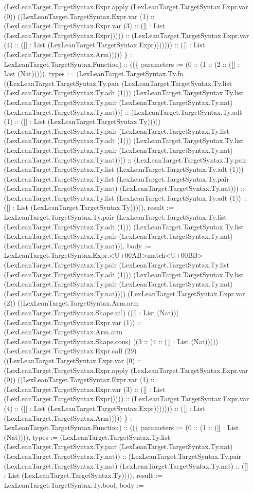 \documentclass[11pt]{article}
\begin{document}
(LexLeanTarget.TargetSyntax.Expr.apply (LexLeanTarget.TargetSyntax.Expr.var (0)) ((LexLeanTarget.TargetSyntax.Expr.var (1) :: (LexLeanTarget.TargetSyntax.Expr.var (3) :: ([] : List (LexLeanTarget.TargetSyntax.Expr))))) :: (LexLeanTarget.TargetSyntax.Expr.var (4) :: ([] : List (LexLeanTarget.TargetSyntax.Expr))))))) :: ([] : List (LexLeanTarget.TargetSyntax.Arm))))) \} : LexLeanTarget.TargetSyntax.Function) :: ((\{ parameters := (0 :: (1 :: (2 :: ([] : List (Nat))))), types := (LexLeanTarget.TargetSyntax.Ty.fn ((LexLeanTarget.TargetSyntax.Ty.pair (LexLeanTarget.TargetSyntax.Ty.list (LexLeanTarget.TargetSyntax.Ty.adt (1))) (LexLeanTarget.TargetSyntax.Ty.list (LexLeanTarget.TargetSyntax.Ty.pair (LexLeanTarget.TargetSyntax.Ty.nat) (LexLeanTarget.TargetSyntax.Ty.nat))) :: (LexLeanTarget.TargetSyntax.Ty.adt (1) :: ([] : List (LexLeanTarget.TargetSyntax.Ty))))) (LexLeanTarget.TargetSyntax.Ty.pair (LexLeanTarget.TargetSyntax.Ty.list (LexLeanTarget.TargetSyntax.Ty.adt (1))) (LexLeanTarget.TargetSyntax.Ty.list (LexLeanTarget.TargetSyntax.Ty.pair (LexLeanTarget.TargetSyntax.Ty.nat) (LexLeanTarget.TargetSyntax.Ty.nat)))) :: (LexLeanTarget.TargetSyntax.Ty.pair (LexLeanTarget.TargetSyntax.Ty.list (LexLeanTarget.TargetSyntax.Ty.adt (1))) (LexLeanTarget.TargetSyntax.Ty.list (LexLeanTarget.TargetSyntax.Ty.pair (LexLeanTarget.TargetSyntax.Ty.nat) (LexLeanTarget.TargetSyntax.Ty.nat))) :: (LexLeanTarget.TargetSyntax.Ty.list (LexLeanTarget.TargetSyntax.Ty.adt (1)) :: ([] : List (LexLeanTarget.TargetSyntax.Ty))))), result := LexLeanTarget.TargetSyntax.Ty.pair (LexLeanTarget.TargetSyntax.Ty.list (LexLeanTarget.TargetSyntax.Ty.adt (1))) (LexLeanTarget.TargetSyntax.Ty.list (LexLeanTarget.TargetSyntax.Ty.pair (LexLeanTarget.TargetSyntax.Ty.nat) (LexLeanTarget.TargetSyntax.Ty.nat))), body := LexLeanTarget.TargetSyntax.Expr.<U+00AB>match<U+00BB> (LexLeanTarget.TargetSyntax.Ty.pair (LexLeanTarget.TargetSyntax.Ty.list (LexLeanTarget.TargetSyntax.Ty.adt (1))) (LexLeanTarget.TargetSyntax.Ty.list (LexLeanTarget.TargetSyntax.Ty.pair (LexLeanTarget.TargetSyntax.Ty.nat) (LexLeanTarget.TargetSyntax.Ty.nat)))) (LexLeanTarget.TargetSyntax.Expr.var (2)) ((LexLeanTarget.TargetSyntax.Arm.arm (LexLeanTarget.TargetSyntax.Shape.nil) (([] : List (Nat))) (LexLeanTarget.TargetSyntax.Expr.var (1)) :: (LexLeanTarget.TargetSyntax.Arm.arm (LexLeanTarget.TargetSyntax.Shape.cons) ((3 :: (4 :: ([] : List (Nat))))) (LexLeanTarget.TargetSyntax.Expr.call (29) ((LexLeanTarget.TargetSyntax.Expr.var (0) :: (LexLeanTarget.TargetSyntax.Expr.apply (LexLeanTarget.TargetSyntax.Expr.var (0)) ((LexLeanTarget.TargetSyntax.Expr.var (1) :: (LexLeanTarget.TargetSyntax.Expr.var (3) :: ([] : List (LexLeanTarget.TargetSyntax.Expr))))) :: (LexLeanTarget.TargetSyntax.Expr.var (4) :: ([] : List (LexLeanTarget.TargetSyntax.Expr))))))) :: ([] : List (LexLeanTarget.TargetSyntax.Arm))))) \} : LexLeanTarget.TargetSyntax.Function) :: ((\{ parameters := (0 :: (1 :: ([] : List (Nat)))), types := (LexLeanTarget.TargetSyntax.Ty.list (LexLeanTarget.TargetSyntax.Ty.pair (LexLeanTarget.TargetSyntax.Ty.nat) (LexLeanTarget.TargetSyntax.Ty.nat)) :: (LexLeanTarget.TargetSyntax.Ty.pair (LexLeanTarget.TargetSyntax.Ty.nat) (LexLeanTarget.TargetSyntax.Ty.nat) :: ([] : List (LexLeanTarget.TargetSyntax.Ty)))), result := LexLeanTarget.TargetSyntax.Ty.bool, body := 
\end{document}
